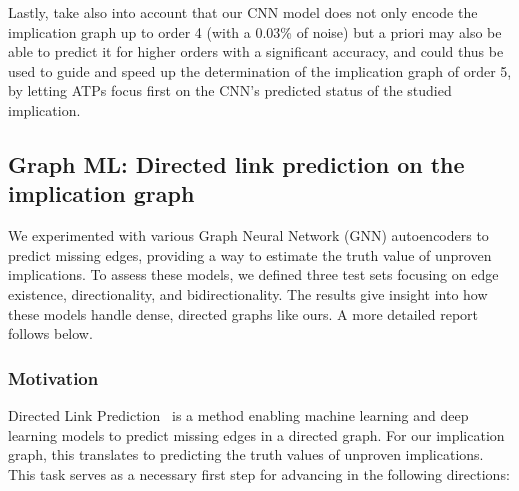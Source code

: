 \smallskip

Lastly, take also into account that our CNN model does not only encode the implication graph up to order 4 (with a 0.03\% of noise) but a priori may also be able to predict it for higher orders with a significant accuracy, and could thus be used to guide and speed up the determination of the implication graph of order 5, by letting ATPs focus first on the CNN’s predicted status of the studied implication.


\subsection{Graph ML: Directed link prediction on the implication graph}
\label{sec:dlp}

We experimented with various Graph Neural Network (GNN) autoencoders to predict missing edges,
providing a way to estimate the truth value of unproven implications. To assess these models,
we defined three test sets focusing on edge existence, directionality, and bidirectionality.
The results give insight into how these models handle dense, directed graphs like ours.
A more detailed report follows below.


\subsubsection{Motivation}

Directed Link Prediction~\cite{Kipf2016} is a method enabling machine learning and deep learning
models to predict missing edges in a directed graph. For our implication graph, this translates to
predicting the truth values of unproven implications. This task serves as a necessary first step
for advancing in the following directions:

